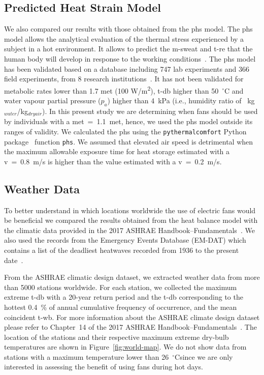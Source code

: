 \subsection{Predicted Heat Strain Model}\label{subsec:predicted-heat-strain-model}

We also compared our results with those obtained from the \ac{phs} model.
The \ac{phs} model allows the analytical evaluation of the thermal stress experienced by a subject in a hot environment.
It allows to predict the \ac{m-sweat} and \ac{t-re} that the human body will develop in response to the working conditions~\cite{iso7933}.
The \ac{phs} model has been validated based on a database including 747 lab experiments and 366 field experiments, from 8 research institutions~\cite{iso7933}.
It has not been validated for metabolic rates lower than 1.7 met (100 W/m\textsuperscript{2}), \ac{t-db} higher than 50~$^{\circ}$C and water vapour partial pressure ($p_{a}$) higher than 4~kPa (i.e., humidity ratio of ~kg$_{water}$/kg$_{dry air}$).
In this present study we are determining when fans should be used by individuals with a \ac{met}~=~1.1~met, hence, we used the \ac{phs} model outside its ranges of validity.
We calculated the \ac{phs} using the \verb|pythermalcomfort| Python package~\cite{Tartarini2020a} function \verb|phs|.
We assumed that elevated air speed is detrimental when the maximum allowable exposure time for heat storage estimated with a \ac{v}~=~0.8~m/s is higher than the value estimated with a \ac{v}~=~0.2~m/s.

\subsection{Weather Data}\label{subsec:weather-data}

To better understand in which locations worldwide the use of electric fans would be beneficial we compared the results obtained from the heat balance model with the climatic data provided in the 2017 ASHRAE Handbook--Fundamentals~\cite{ASHRA2017}.
We also used the records from the Emergency Events Database (EM-DAT) which contains a list of the deadliest heatwaves recorded from 1936 to the present date~\cite{EMDATThe70:online}.

From the ASHRAE climatic design dataset, we extracted weather data from more than 5000 stations worldwide.
For each station, we collected the maximum extreme \ac{t-db} with a 20-year return period
and the \ac{t-db} corresponding to the hottest 0.4~\% of annual cumulative frequency of occurrence, and the mean coincident \ac{t-wb}.
For more information about the ASHRAE climate design dataset please refer to Chapter~14 of the 2017 ASHRAE Handbook--Fundamentals~\cite{ASHRA2017}.
The location of the stations and their respective maximum extreme dry-bulb temperatures are shown in Figure~\ref{fig:world-map}.
We do not show data from stations with a maximum temperature lower than 26~$^\circ$C\@ since we are only interested in assessing the benefit of using fans during hot days.

